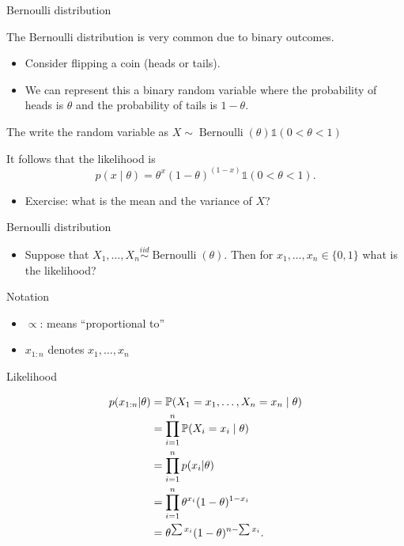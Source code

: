 \documentclass[
  ignorenonframetext,
]{beamer}
\providecommand{\tightlist}{%
  \setlength{\itemsep}{0pt}\setlength{\parskip}{0pt}}
\DeclareMathOperator*{\Bernoulli}{Bernoulli}
\renewcommand{\Pr}{\mathbb{P}}
\newcommand{\I}{\mathds{1}}
\begin{document}
\begin{frame}{Bernoulli distribution}
\protect\hypertarget{bernoulli-distribution}{}

The Bernoulli distribution is very common due to binary outcomes.

\begin{itemize}
\tightlist
\item
  Consider flipping a coin (heads or tails).
\item
  We can represent this a binary random variable where the probability
  of heads is \(\theta\) and the probability of tails is \(1-\theta.\)
\end{itemize}

The write the random variable as
\(X \sim \Bernoulli(\theta) \I(0 < \theta < 1)\)

It follows that the likelihood is
\[p(x \mid \theta) = \theta^x (1-\theta)^{(1-x)}\I(0 < \theta < 1).\]

\begin{itemize}
\tightlist
\item
  Exercise: what is the mean and the variance of \(X\)?
\end{itemize}

\end{frame}

\begin{frame}{Bernoulli distribution}
\protect\hypertarget{bernoulli-distribution-1}{}

\begin{itemize}
\tightlist
\item
  Suppose that
  \(X_1,\ldots,X_n \stackrel{iid}{\sim} \Bernoulli(\theta).\) Then for
  \(x_1,\ldots,x_n \in \{0,1\}\) what is the likelihood?
\end{itemize}

\end{frame}

\begin{frame}{Notation}
\protect\hypertarget{notation}{}

\begin{itemize}
\tightlist
\item
  \(\propto\): means ``proportional to''
\item
  \(x_{1:n}\) denotes \(x_1,\ldots,x_n\)
\end{itemize}

\end{frame}

\begin{frame}{Likelihood}
\protect\hypertarget{likelihood}{}

\[
\begin{aligned}
p(x_{1:n}|\theta) &= \Pr(X_1 = x_1,\dotsc,X_n = x_n\mid\theta) \notag\\
& =\prod_{i = 1}^n \Pr(X_i = x_i\mid\theta) \notag\\
& = \prod_{i = 1}^n p(x_i|\theta) \notag\\
& =\prod_{i = 1}^n \theta^{x_i}(1-\theta)^{1-x_i} \notag\\
& =\theta^{\sum x_i}(1-\theta)^{n-\sum x_i}. \label{equation:likelihood}
\end{aligned}
\]

\end{frame}
\end{document}
